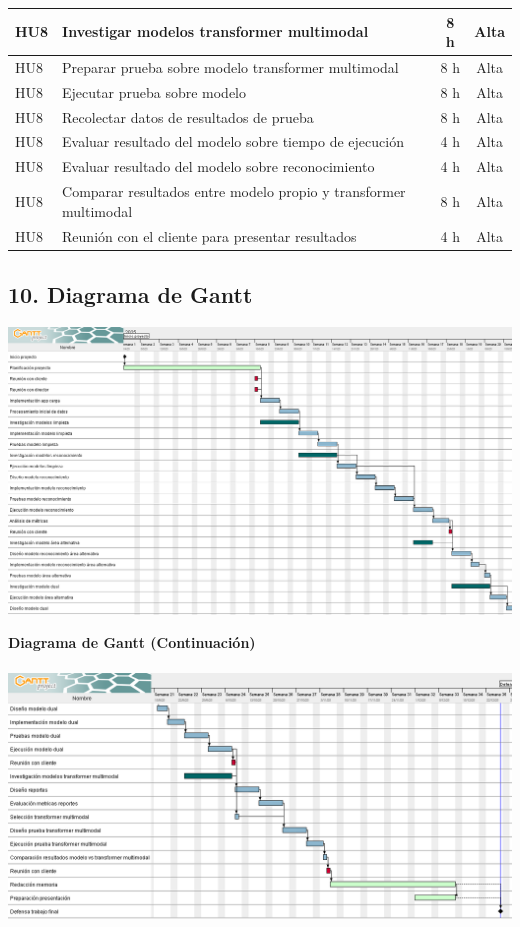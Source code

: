 \documentclass[
11pt, %
]{charter}
\begin{document}
\begin{table}[H]
\begin{tabularx}{\linewidth}{@{}|l|X|c|c|@{}}
HU8 & Investigar modelos transformer multimodal & 8 h & Alta \\ \hline
HU8 & Preparar prueba sobre modelo transformer multimodal & 8 h & Alta \\ \hline

HU8 & Ejecutar prueba sobre modelo & 8 h & Alta \\ \hline
HU8 & Recolectar datos de resultados de prueba & 8 h & Alta \\ \hline

HU8 & Evaluar resultado del modelo sobre tiempo de ejecución & 4 h & Alta \\ \hline
HU8 & Evaluar resultado del modelo sobre reconocimiento & 4 h & Alta \\ \hline
HU8 & Comparar resultados entre modelo propio y transformer multimodal & 8 h & Alta \\ \hline
HU8 & Reunión con el cliente para presentar resultados & 4 h & Alta \\ \hline

\end{tabularx}
\end{table}

\newpage
\begin{landscape}
\section{10. Diagrama de Gantt}
\includegraphics[width=1.53\textwidth]{./Figuras/Gantt-1.png}

\newpage
\textbf{Diagrama de Gantt (Continuación)} \\
\\
\includegraphics[width=1.53\textwidth]{./Figuras/Gantt-2.png}

\end{landscape}
\newpage
\end{document}
